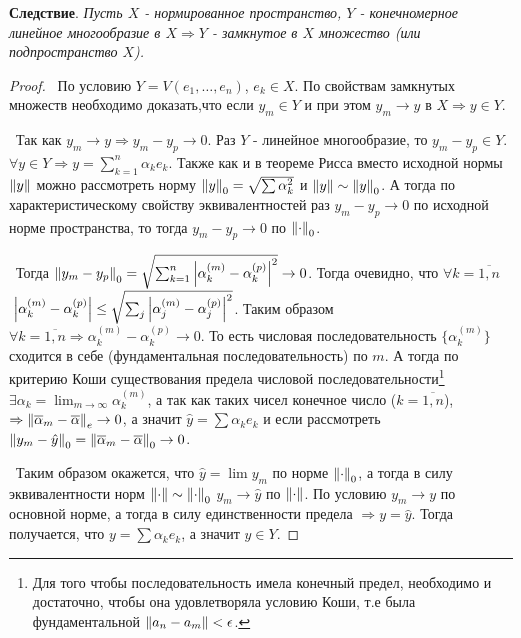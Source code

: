 \noindent \textbf{Следствие}. \textit{Пусть $X$ - нормированное пространство, $Y$ - конечномерное линейное многообразие в $X \Rightarrow
Y$ - замкнутое в $X$ множество (или подпространство $X$).}

\begin{proof}

\noindent \textbullet~По условию $Y = V(e_1, \dots, e_n)$, $e_k \in X$. По свойствам замкнутых множеств необходимо доказать,что если $y_m \in Y$ и при этом 
$y_m \to y$ в $X \Rightarrow y \in Y$. 

\smallskip 
\noindent \textbullet~Так как $y_m \to y \Rightarrow y_m - y_p \to 0$. Раз $Y$ - линейное многообразие, то $y_m - y_p \in Y$. $\forall y \in Y \Rightarrow y = \sum_{k = 1}
^n \alpha_k e_k$. Также как и в теореме Рисса вместо исходной нормы $\left\lVert y\right\rVert$ можно рассмотреть норму $\left\lVert y\right\rVert_0 = \sqrt{\sum \alpha_k^2}$ и $\left\lVert y\right\rVert \sim \left\lVert y\right\rVert_0$.
А тогда по характеристическому свойству эквивалентностей раз $y_m - y_p \to 0$ по исходной норме пространства, то тогда $y_m - y_p \to 0$ по $\left\lVert\cdot\right\rVert_0$.

\smallskip 
\noindent \textbullet~Тогда $\left\lVert y_m - y_p\right\rVert_0 = \sqrt{\sum_{k = 1}^{n} \left\lvert\alpha_k^{(m)} - \alpha_k^{(p)}\right\rvert^2} \to 0$. Тогда очевидно, что $\forall k = \overline{ 1,n}$
$\; \left\lvert\alpha_k^{(m)} - \alpha_k^{(p)}\right\rvert \le \sqrt{\sum_j \left\lvert\alpha_j^{(m)} - \alpha_j^{(p)}\right\rvert^2}$. Таким образом $\forall k = \overline{1, n} \Rightarrow
\alpha_k^{(m)} - \alpha_k^{(p)} \to 0$. То есть числовая последовательность $\{ \alpha_k^{(m)}\}$ сходится в себе (фундаментальная последовательность) по $m$. 
А тогда по критерию Коши существования предела
числовой последовательности\footnote{Для того чтобы последовательность имела конечный предел, необходимо и достаточно, чтобы она удовлетворяла условию Коши, т.е была 
фундаментальной $\left\lVert a_n - a_m\right\rVert < \epsilon$.} $\exists \alpha_k = \lim_{m \to \infty} \alpha_k^{(m)}$, а так как таких чисел конечное число ($k = \overline{1, n}$),
$\Rightarrow \left\lVert\overline{\alpha}_m - \overline{\alpha}\right\rVert_e \to 0$, а значит $\hat{y} = \sum \alpha_k e_k$ и если рассмотреть $\left\lVert y_m - \hat{y}\right\rVert_0 = \left\lVert\overline
{\alpha}_m - \overline{\alpha}\right\rVert_0 \to 0$. 

\smallskip
\noindent \textbullet~Таким образом окажется, что $\hat{y} = \lim y_m$ по норме $\left\lVert\cdot\right\rVert_0$, а тогда в силу эквивалентности норм $\left\lVert\cdot\right\rVert \sim
\left\lVert\cdot\right\rVert_0$ $y_m \to \hat{y}$ по $\left\lVert\cdot\right\rVert$. По условию $y_m \to y$ по основной норме, а тогда в силу единственности предела $\Rightarrow y = \hat{y}$. Тогда 
получается, что $y = \sum \alpha_k e_k$, а значит $y \in Y$.
\end{proof}

